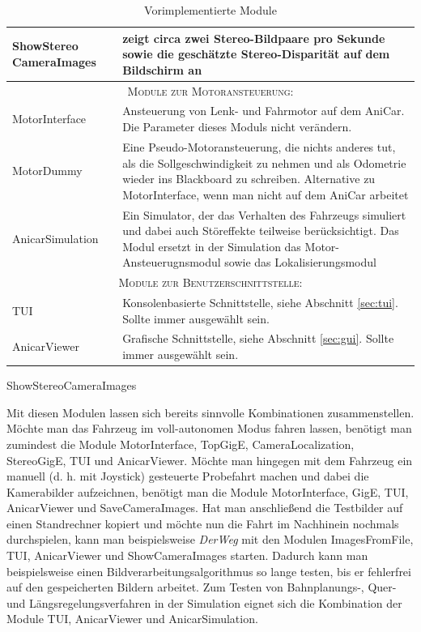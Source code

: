 \documentclass[a4paper, 11pt]{article}
\newcommand{\DerWeg}{\textit{DerWeg }}  %
\begin{document}
{\begin{table}
\begin{tabular}{p{}p{}}
ShowStereo \hspace*{2em}\mbox{CameraImages} & \raggedright zeigt circa zwei Stereo-Bildpaare pro Sekunde sowie die geschätzte Stereo-Disparität auf dem Bildschirm an \tabularnewline
\hline
\multicolumn{2}{|c|}{\textsc{Module zur Motoransteuerung:}} \\
\hline
MotorInterface & \raggedright Ansteuerung von Lenk- und Fahrmotor auf dem AniCar. Die Parameter dieses Moduls nicht verändern. \tabularnewline
MotorDummy & \raggedright Eine Pseudo-Motoransteuerung, die nichts anderes tut, als die Sollgeschwindigkeit zu nehmen und als Odometrie wieder ins Blackboard zu schreiben. Alternative zu MotorInterface, wenn man nicht auf dem AniCar arbeitet \tabularnewline
AnicarSimulation & \raggedright Ein Simulator, der das Verhalten des Fahrzeugs simuliert und dabei auch Störeffekte teilweise berücksichtigt. Das Modul ersetzt in der Simulation das Motor-Ansteuerugnsmodul sowie das Lokalisierungsmodul \tabularnewline
\hline
\multicolumn{2}{|c|}{\textsc{Module zur Benutzerschnittstelle:}} \\
\hline
TUI & \raggedright Konsolenbasierte Schnittstelle, siehe Abschnitt \ref{sec:tui}. Sollte immer ausgewählt sein. \tabularnewline
AnicarViewer & \raggedright Grafische Schnittstelle, siehe Abschnitt \ref{sec:gui}. Sollte immer ausgewählt sein. \tabularnewline
\hline
\end{tabular}
\caption{Vorimplementierte Module}
\label{tab:modules}
\end{table} ShowStereoCameraImages

Mit diesen Modulen lassen sich bereits sinnvolle Kombinationen zusammenstellen. Möchte man das Fahrzeug im voll-autonomen Modus fahren lassen, benötigt man zumindest die Module MotorInterface, TopGigE, CameraLocalization, StereoGigE, TUI und AnicarViewer. Möchte man hingegen mit dem Fahrzeug ein manuell (d. h. mit Joystick) gesteuerte Probefahrt machen und dabei die Kamerabilder aufzeichnen, benötigt man die Module MotorInterface, GigE, TUI, AnicarViewer und SaveCameraImages. Hat man anschließend die Testbilder auf einen Standrechner kopiert und möchte nun die Fahrt im Nachhinein nochmals durchspielen, kann man beispielsweise \DerWeg mit den Modulen ImagesFromFile, TUI, AnicarViewer und ShowCameraImages starten. Dadurch kann man beispielsweise einen Bildverarbeitungsalgorithmus so lange testen, bis er fehlerfrei auf den gespeicherten Bildern arbeitet. Zum Testen von Bahnplanungs-, Quer- und Längsregelungsverfahren in der Simulation eignet sich die Kombination der Module TUI, AnicarViewer und AnicarSimulation.

}
\end{document}
